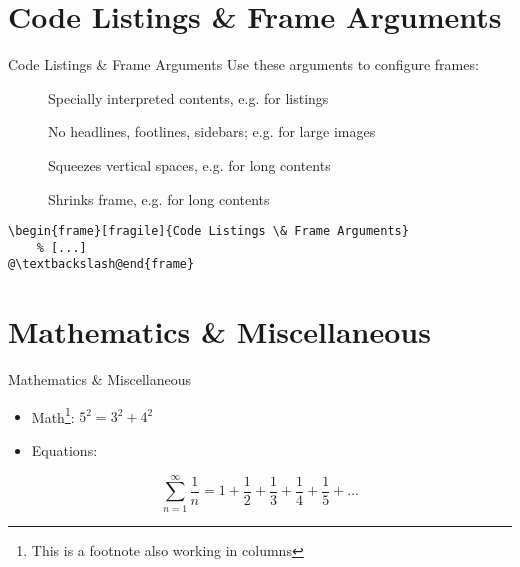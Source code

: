 \documentclass{beamer}
\begin{document}
\section{Code Listings \& Frame Arguments}
\begin{frame}[fragile]{Code Listings \& Frame Arguments}
	Use these arguments to configure frames:
	\begin{description}
		\item[\hfill]
		Specially interpreted contents, e.g. for listings
		\item[\hfill]
		No headlines, footlines, sidebars; e.g. for large images\\
		\item[\hfill]
		Squeezes vertical spaces, e.g. for long contents
		\item[\hfill]
		Shrinks frame, e.g. for long contents
	\end{description}
	\begin{lstlisting}[caption={Frame Options}]
\begin{frame}[fragile]{Code Listings \& Frame Arguments}
	% [...]
@\textbackslash@end{frame}
	\end{lstlisting}
\end{frame}

\section{Mathematics \& Miscellaneous}
\begin{frame}{Mathematics \& Miscellaneous}
	\begin{itemize}
		\item Math\footnote[frame]{This is a footnote also working in columns}: $5^{2}=3^{2}+4^{2}$
		\item Equations:
	\end{itemize}
	\begin{equation}
		\sum_{n = 1}^{\infty} \frac{1}{n} = 1 + \frac{1}{2} + \frac{1}{3} + \frac{1}{4} + \frac{1}{5} + \dots 
	\end{equation}
\end{frame}
\end{document}

